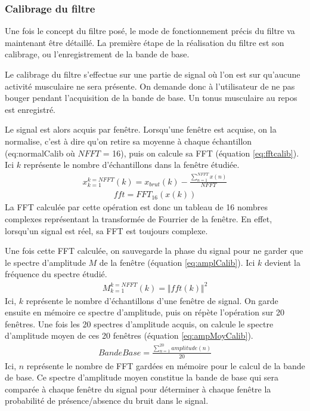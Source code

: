 \documentclass[letterpaper, twoside, 12pt, memoire, creativecommons, hyperref]{thETS}
\begin{document}
\subsubsection{Calibrage du filtre}

Une fois le concept du filtre posé, le mode de fonctionnement précis du filtre va maintenant être détaillé. La première étape de la réalisation du filtre est son calibrage, ou l'enregistrement de la bande de base. 

Le calibrage du filtre s'effectue sur une partie de signal où l'on est sur qu'aucune activité musculaire ne sera présente. On demande donc à l'utilisateur de ne pas bouger pendant l'acquisition de la bande de base. Un tonus musculaire au repos est enregistré.

Le signal est alors acquis par fenêtre. Lorsqu'une fenêtre est acquise, on la normalise, c'est à dire qu'on retire sa moyenne à chaque échantillon (eq:normalCalib où $NFFT$ = 16), puis on calcule sa FFT (équation \ref{eq:fftcalib}). Ici $k$ représente le nombre d'échantillons dans la fenêtre étudiée.
\begin{align}\label{eq:normalCalib}
   x_{k=1}^{k=NFFT}(k) = x_{brut}(k) - \frac{\sum_{n=1}^{NFFT}x(n)}{NFFT}
\end{align}
\begin{align}\label{eq:fftcalib}
   fft = FFT_{16}(x(k)) 
\end{align}
La FFT calculée par cette opération est donc un tableau de 16 nombres complexes représentant la transformée de Fourrier de la fenêtre. En effet, lorsqu'un signal est réel, sa FFT est toujours complexe.

Une fois cette FFT calculée, on sauvegarde la phase du signal pour ne garder que le spectre d'amplitude $M$ de la fenêtre (équation \ref{eq:amplCalib}). Ici $k$ devient la fréquence du spectre étudié.
\begin{align}\label{eq:amplCalib}
   M_{k=1}^{k=NFFT}(k) = \Vert fft(k) \Vert^2
\end{align}
Ici, $k$ représente le nombre d'échantillons d'une fenêtre de signal. On garde ensuite en mémoire ce spectre d'amplitude, puis on répète l'opération sur 20 fenêtres. Une fois les 20 spectres d'amplitude acquis, on calcule le spectre d'amplitude moyen de ces 20 fenêtres (équation \ref{eq:ampMoyCalib}).
\begin{align}\label{eq:ampMoyCalib}
   BandeBase = \frac{\sum_{n=1}^{20}amplitude(n)}{20}
\end{align}
Ici, $n$ représente le nombre de FFT gardées en mémoire pour le calcul de la bande de base. Ce spectre d'amplitude moyen constitue la bande de base qui sera comparée à chaque fenêtre du signal pour déterminer à chaque fenêtre la probabilité de présence/absence du bruit dans le signal.
\end{document}
